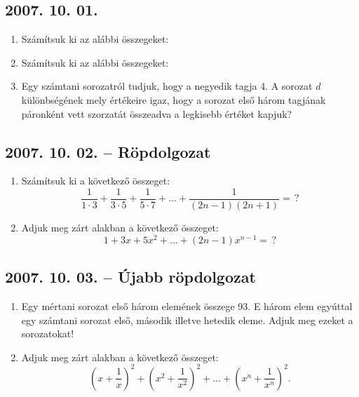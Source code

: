\subsection*{2007. 10. 01.}
\begin{enumerate}
\item Számítsuk ki az alábbi összegeket:
\item Számítsuk ki az alábbi összegeket:
\item Egy számtani sorozatról tudjuk, hogy a negyedik tagja 4.
A sorozat $d$ különbségének mely értékeire igaz, hogy a sorozat első három tagjának páronként vett szorzatát összeadva a legkisebb értéket kapjuk?
\end{enumerate}

\subsection*{2007. 10. 02. -- Röpdolgozat}
\begin{enumerate}
\item  Számítsuk ki a következő összeget:
$$\frac{1}{1\cdot 3}+\frac{1}{3\cdot 5}+\frac{1}{5\cdot 7}+ \ldots+\frac{1}{(2n-1)(2n+1)}=\,?$$
\item Adjuk meg zárt alakban a következő összeget:
$$1+3x+5x^2+\ldots+(2n-1)x^{n-1}=\,?$$
\end{enumerate}

\subsection*{2007. 10. 03. -- Újabb röpdolgozat}
\begin{enumerate}
\item Egy mértani sorozat első három elemének összege 93. E három elem egyúttal egy számtani sorozat első, második illetve hetedik eleme. Adjuk meg ezeket a sorozatokat! 
\item Adjuk meg zárt alakban a következő összeget:
$$\left(x+\frac{1}{x}\right)^2+\left(x^2+\frac{1}{x^2}\right)^2+\ldots+\left(x^n+\frac{1}{x^n}\right)^2 .$$
\end{enumerate}

